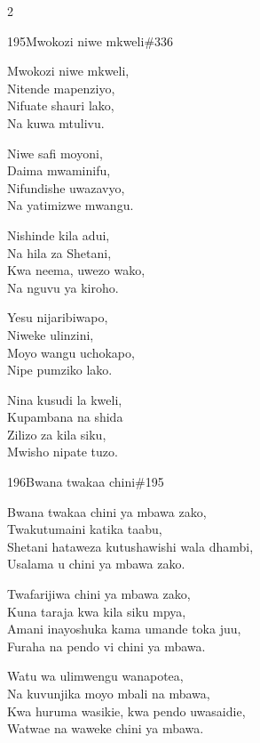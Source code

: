 \begin{multicols}{2}
\begin{hymn}{195}{Mwokozi niwe mkweli}{\#336}
\begin{stanza}
Mwokozi niwe mkweli,\\
Nitende mapenziyo,\\
Nifuate shauri lako,\\
Na kuwa mtulivu.
\end{stanza}
\begin{chorus}
Niwe safi moyoni,\\
Daima mwaminifu,\\
Nifundishe uwazavyo,\\
Na yatimizwe mwangu.
\end{chorus}
\begin{stanza}
Nishinde kila adui,\\
Na hila za Shetani,\\
Kwa neema, uwezo wako,\\
Na nguvu ya kiroho.
\end{stanza}
\begin{stanza}
Yesu nijaribiwapo,\\
Niweke ulinzini,\\
Moyo wangu uchokapo,\\
Nipe pumziko lako.
\end{stanza}
\begin{stanza}
Nina kusudi la kweli,\\
Kupambana na shida\\
Zilizo za kila siku,\\
Mwisho nipate tuzo.
\end{stanza}
\end{hymn}

\begin{hymn}{196}{Bwana twakaa chini}{\#195}
\begin{stanza}
Bwana twakaa chini ya mbawa zako,\\
Twakutumaini katika taabu,\\
Shetani hataweza kutushawishi wala dhambi,\\
Usalama u chini ya mbawa zako.
\end{stanza}
\begin{stanza}
Twafarijiwa chini ya mbawa zako,\\
Kuna taraja kwa kila siku mpya,\\
Amani inayoshuka kama umande toka juu,\\
Furaha na pendo vi chini ya mbawa.
\end{stanza}
\begin{stanza}
Watu wa ulimwengu wanapotea,\\
Na kuvunjika moyo mbali na mbawa,\\
Kwa huruma wasikie, kwa pendo uwasaidie,\\
Watwae na waweke chini ya mbawa.
\end{stanza}
\end{hymn}


\end{multicols}
